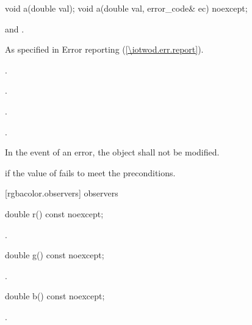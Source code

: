 \begin{itemdecl}
	void a(double val);
	void a(double val, error_code& ec) noexcept;
\end{itemdecl}
\begin{itemdescr}
	\pnum
	\requires
	 and .
	
	\pnum
	\throws
	As specified in Error reporting (\ref{\iotwod.err.report}).
	
	\pnum
	\postconditions
	.
	
	.
	
	.
	
	.

	\pnum
	\remarks
	In the event of an error, the object shall not be modified.
	
	\pnum
	\errors
	 if the value of  fails to meet the preconditions.
	
\end{itemdescr}

 [rgbacolor.observers]{ observers}

\begin{itemdecl}
	double r() const noexcept;
\end{itemdecl}
\begin{itemdescr}
	\pnum
	\returns
	.
\end{itemdescr}

\begin{itemdecl}
	double g() const noexcept;
\end{itemdecl}
\begin{itemdescr}
	\pnum
	\returns
	.
\end{itemdescr}

\begin{itemdecl}
	double b() const noexcept;
\end{itemdecl}
\begin{itemdescr}
	\pnum
	\returns
	.
\end{itemdescr}

